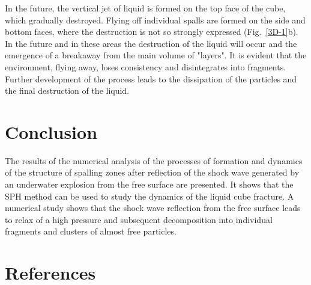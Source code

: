 \documentclass[a4paper]{jpconf}
\begin{document}
In the future, the vertical jet of liquid is formed on the top face of the cube, which gradually destroyed. Flying off individual spalls are formed on the side and bottom faces, where the destruction is not so strongly expressed (Fig.~\ref{3D-1}b).
In the future and in these areas the destruction of the liquid will occur and the emergence of a breakaway from the main volume of "layers". It is evident that the environment, flying away, loses consistency and disintegrates into fragments.
Further development of the process leads to the dissipation of the particles and the final destruction of the liquid.

\section{Conclusion}

The results of the numerical analysis of the processes of formation and dynamics of the structure of spalling zones after reflection of the shock wave generated by an underwater explosion from the free surface are presented. It shows that the SPH method can be used to study the dynamics of the liquid cube fracture.  A numerical study shows that the shock wave reflection from the free surface leads to relax of a high pressure and subsequent decomposition into individual fragments and clusters of almost free particles.


\section*{References}
%


\end{document}
